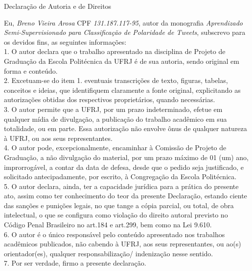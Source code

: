\begin{center}
Declaração de Autoria e de Direitos
\end{center}

\vspace{0.5cm}

Eu, \emph{Breno Vieira Arosa} CPF \emph{131.187.117-95}, autor da monografia \emph{Aprendizado Semi-Supervisionado para Classificação de Polaridade de Tweets}, subscrevo para os devidos fins, as seguintes informações:\\
1. O autor declara que o trabalho apresentado na disciplina de Projeto de Graduação da Escola Politécnica da UFRJ é de sua autoria, sendo original em forma e conteúdo.\\
2. Excetuam-se do item 1. eventuais transcrições de texto, figuras, tabelas, conceitos e ideias, que identifiquem claramente a fonte original, explicitando as autorizações obtidas dos respectivos proprietários, quando necessárias.\\
3. O autor permite que a UFRJ, por um prazo indeterminado, efetue em qualquer mídia de divulgação, a publicação do trabalho acadêmico em sua totalidade, ou em parte. Essa autorização não envolve ônus de qualquer natureza à UFRJ, ou aos seus representantes.\\
4. O autor pode, excepcionalmente, encaminhar à Comissão de Projeto de Graduação, a não divulgação do material, por um prazo máximo de 01 (um) ano, improrrogável, a contar da data de defesa, desde que o pedido seja justificado, e solicitado antecipadamente, por escrito, à Congregação da Escola Politécnica.\\
5. O autor declara, ainda, ter a capacidade jurídica para a prática do presente ato, assim como ter conhecimento do teor da presente Declaração, estando ciente das sanções e punições legais, no que tange a cópia parcial, ou total, de obra intelectual, o que se configura como violação do direito autoral previsto no Código Penal Brasileiro no art.184 e art.299, bem como na Lei 9.610.\\
6. O autor é o único responsável pelo conteúdo apresentado nos trabalhos acadêmicos publicados, não cabendo à UFRJ, aos seus representantes,  ou ao(s) orientador(es), qualquer responsabilização/ indenização nesse sentido.\\
7. Por ser verdade, firmo a presente declaração.\\

      \vspace{0.5cm}
      \begin{flushright}
         \parbox{10cm}{
            \hrulefill

            \vspace{-.375cm}

            \vspace{0.1cm}
         }
      \end{flushright}

